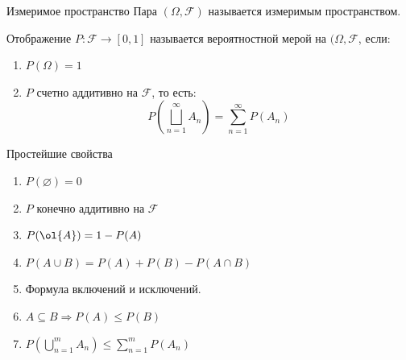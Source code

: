 \begin{defn}{Измеримое пространство}{}
    Пара \( (\Omega, \mathcal{F}) \) называется измеримым пространством.
\end{defn}

\begin{defn}{}{}
    Отображение \( P : \mathcal{F} \to [0, 1] \) называется вероятностной мерой
    на \( ( \Omega, \mathcal{F} \), если:
    \begin{enumerate}
        \item
            \( P(\Omega) = 1 \)
        \item
            \( P \) счетно аддитивно на \( \mathcal{F} \),
            то есть:
            \[
                P \left( \bigsqcup\limits_{n = 1}^{\infty} A_n \right)
                =
                \sum\limits_{n = 1}^{\infty} P(A_n)
            \]
    \end{enumerate}
\end{defn}

\begin{lemma}{Простейшие свойства}{}
    \begin{enumerate}
        \item
            \( P(\varnothing) = 0 \)
        \item
            \( P \) конечно аддитивно на \( \mathcal{F} \)
        \item
            \( P(\ol{A}) = 1 - P(A) \)
        \item
            \( P(A \cup B) = P(A) + P(B) - P(A \cap B) \)
        \item
            Формула включений и исключений.
        \item
            \( A \subseteq B \Rightarrow P(A) \leq P(B) \)
        \item
            \( P \left( \bigcup\limits_{n = 1}^{m} A_n \right) \leq \sum\limits_{n = 1}^{m} P(A_n) \)
    \end{enumerate}
\end{lemma}

